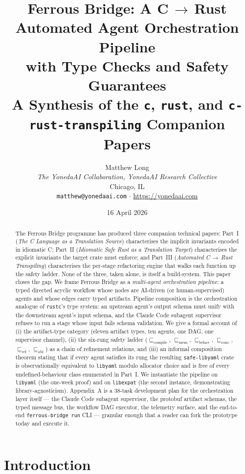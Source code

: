 \documentclass[12pt]{article}
\title{Ferrous Bridge: A C\,$\to$\,Rust Automated Agent Orchestration Pipeline\\
with Type Checks and Safety Guarantees\\[0.5em]
\large A Synthesis of the \texttt{c}, \texttt{rust}, and
\texttt{c-rust-transpiling} Companion Papers}
\author{Matthew Long\\
\textit{The YonedaAI Collaboration, YonedaAI Research Collective}\\
Chicago, IL\\
\texttt{matthew@yonedaai.com} $\cdot$ \url{https://yonedaai.com}}
\date{16 April 2026}
\theoremstyle{definition}
\theoremstyle{remark}
\newcommand{\libyaml}{\texttt{libyaml}}
\newcommand{\safelibyaml}{\texttt{safe-libyaml}}
\newcommand{\libexpat}{\texttt{libexpat}}
\newcommand{\Compile}{\ensuremath{\sqsubseteq_{\!\mathrm{compile}}}}
\newcommand{\Memory}{\ensuremath{\sqsubseteq_{\!\mathrm{mem}}}}
\newcommand{\Behav}{\ensuremath{\sqsubseteq_{\!\mathrm{behav}}}}
\newcommand{\Conc}{\ensuremath{\sqsubseteq_{\!\mathrm{conc}}}}
\newcommand{\Refine}{\ensuremath{\sqsubseteq_{\!\mathrm{ref}}}}
\newcommand{\ABI}{\ensuremath{\sqsubseteq_{\!\mathrm{abi}}}}
\begin{document}
\maketitle

\begin{abstract}
The Ferrous Bridge programme has produced three companion technical papers:
Part~I (\emph{The C Language as a Translation Source}) characterises the
implicit invariants encoded in idiomatic C; Part~II (\emph{Idiomatic Safe
Rust as a Translation Target}) characterises the explicit invariants the
target crate must enforce; and Part~III (\emph{Automated C\,$\to$\,Rust
Transpiling}) characterises the per-stage refactoring engine that walks
each function up the safety ladder. None of the three, taken alone, is
itself a build-system. This paper closes the gap. We frame Ferrous Bridge
as a \emph{multi-agent orchestration pipeline}: a typed directed acyclic
workflow whose nodes are AI-driven (or human-supervised) agents and whose
edges carry typed artifacts. Pipeline composition is the orchestration
analogue of \texttt{rustc}'s type system: an upstream agent's output
schema must unify with the downstream agent's input schema, and the
Claude Code subagent supervisor refuses to run a stage whose input fails schema
validation. We give a formal account of (i) the artifact-type category
(eleven artifact types, ten agents, one DAG, one supervisor channel),
(ii) the six-rung safety ladder ($\Compile$, $\Memory$, $\Behav$,
$\Conc$, $\Refine$, $\ABI$) as a chain of refinement relations, and
(iii) an informal composition theorem stating that if every agent
satisfies its rung the resulting \safelibyaml{} crate is observationally
equivalent to \libyaml{} modulo allocator choice and is free of every
undefined-behaviour class enumerated in Part~I. We instantiate the
pipeline on \libyaml{} (the one-week proof) and on \libexpat{} (the
second instance, demonstrating library-agnosticism). Appendix~A is a
38-task development plan for the orchestration layer itself --- the
Claude Code subagent supervisor, the protobuf artifact schemas, the typed message bus,
the workflow DAG executor, the telemetry surface, and the end-to-end
\texttt{ferrous-bridge run} CLI --- granular enough that a reader can
fork the prototype today and execute it.
\end{abstract}

\tableofcontents
\newpage

\section{Introduction}
\label{sec:intro}
\end{document}

